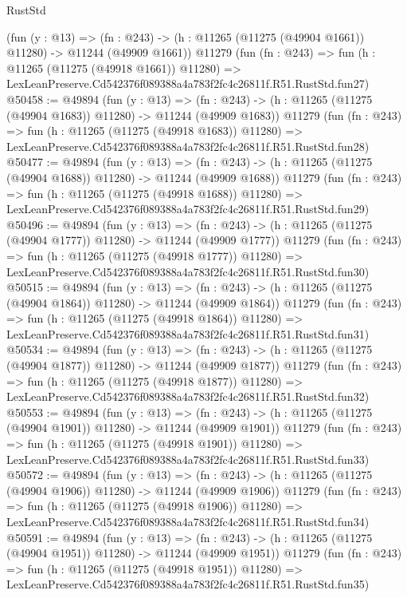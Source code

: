 \begin{lexlean}{RustStd}
\begin{coremodule}
    (fun (y : @13) =>
    (fn : @243) -> (h : @11265 (@11275 (@49904 @1661)) @11280) -> @11244 (@49909 @1661))
    @11279
    (fun (fn : @243) =>
    fun (h : @11265 (@11275 (@49918 @1661)) @11280) =>
    LexLeanPreserve.Cd542376f089388a4a783f2fc4c26811f.R51.RustStd.fun27)
@50458 := @49894
    (fun (y : @13) =>
    (fn : @243) -> (h : @11265 (@11275 (@49904 @1683)) @11280) -> @11244 (@49909 @1683))
    @11279
    (fun (fn : @243) =>
    fun (h : @11265 (@11275 (@49918 @1683)) @11280) =>
    LexLeanPreserve.Cd542376f089388a4a783f2fc4c26811f.R51.RustStd.fun28)
@50477 := @49894
    (fun (y : @13) =>
    (fn : @243) -> (h : @11265 (@11275 (@49904 @1688)) @11280) -> @11244 (@49909 @1688))
    @11279
    (fun (fn : @243) =>
    fun (h : @11265 (@11275 (@49918 @1688)) @11280) =>
    LexLeanPreserve.Cd542376f089388a4a783f2fc4c26811f.R51.RustStd.fun29)
@50496 := @49894
    (fun (y : @13) =>
    (fn : @243) -> (h : @11265 (@11275 (@49904 @1777)) @11280) -> @11244 (@49909 @1777))
    @11279
    (fun (fn : @243) =>
    fun (h : @11265 (@11275 (@49918 @1777)) @11280) =>
    LexLeanPreserve.Cd542376f089388a4a783f2fc4c26811f.R51.RustStd.fun30)
@50515 := @49894
    (fun (y : @13) =>
    (fn : @243) -> (h : @11265 (@11275 (@49904 @1864)) @11280) -> @11244 (@49909 @1864))
    @11279
    (fun (fn : @243) =>
    fun (h : @11265 (@11275 (@49918 @1864)) @11280) =>
    LexLeanPreserve.Cd542376f089388a4a783f2fc4c26811f.R51.RustStd.fun31)
@50534 := @49894
    (fun (y : @13) =>
    (fn : @243) -> (h : @11265 (@11275 (@49904 @1877)) @11280) -> @11244 (@49909 @1877))
    @11279
    (fun (fn : @243) =>
    fun (h : @11265 (@11275 (@49918 @1877)) @11280) =>
    LexLeanPreserve.Cd542376f089388a4a783f2fc4c26811f.R51.RustStd.fun32)
@50553 := @49894
    (fun (y : @13) =>
    (fn : @243) -> (h : @11265 (@11275 (@49904 @1901)) @11280) -> @11244 (@49909 @1901))
    @11279
    (fun (fn : @243) =>
    fun (h : @11265 (@11275 (@49918 @1901)) @11280) =>
    LexLeanPreserve.Cd542376f089388a4a783f2fc4c26811f.R51.RustStd.fun33)
@50572 := @49894
    (fun (y : @13) =>
    (fn : @243) -> (h : @11265 (@11275 (@49904 @1906)) @11280) -> @11244 (@49909 @1906))
    @11279
    (fun (fn : @243) =>
    fun (h : @11265 (@11275 (@49918 @1906)) @11280) =>
    LexLeanPreserve.Cd542376f089388a4a783f2fc4c26811f.R51.RustStd.fun34)
@50591 := @49894
    (fun (y : @13) =>
    (fn : @243) -> (h : @11265 (@11275 (@49904 @1951)) @11280) -> @11244 (@49909 @1951))
    @11279
    (fun (fn : @243) =>
    fun (h : @11265 (@11275 (@49918 @1951)) @11280) =>
    LexLeanPreserve.Cd542376f089388a4a783f2fc4c26811f.R51.RustStd.fun35)

\end{coremodule}
\end{lexlean}
